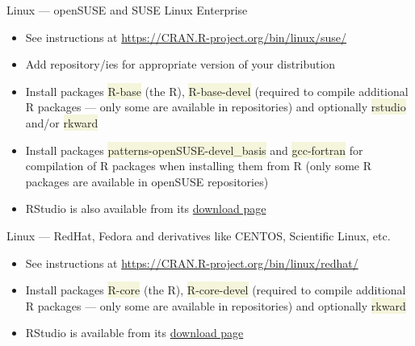 \documentclass[compress, ucs, xelatex, 11pt, xcolor=svgnames, aspectratio=169,
	hyperref={
		bookmarks=true,
		unicode=true,
		colorlinks=true,
		pdftitle={Molecular data in R},
		plainpages=false,
		pdfauthor={Vojtech Zeisek},
		pdfsubject={Course about phylogeny and evolution in R},
		pdfcreator={XeLaTeX},
		pdfkeywords={R, evolution, phylogeny, molecular data},
		linkcolor=Crimson, %
		anchorcolor=Magenta, %
		citecolor=Magenta, %
		filecolor=Magenta, %
		menucolor=Magenta, %
		urlcolor=DodgerBlue, %
		pdftex},
	url={hyphens, lowtilde} %
	]{beamer}
\renewcommand{\texttt}[1]{\colorbox{Beige}{{\ttfamily #1}}}
\begin{document}
\begin{frame}{Linux --- openSUSE and SUSE Linux Enterprise}
	\begin{itemize}
		\item See instructions at \url{https://CRAN.R-project.org/bin/linux/suse/}
		\item Add repository/ies for appropriate version of your distribution
		\begin{itemize}
		\end{itemize}
		\item Install packages \texttt{R-base} (the R), \texttt{R-base-devel} (required to compile additional R packages --- only some are available in repositories) and optionally \texttt{rstudio} and/or \texttt{rkward}
		\item Install packages \texttt{patterns-openSUSE-devel\_basis} and \texttt{gcc-fortran} for compilation of R packages when installing them from R (only some R packages are available in openSUSE repositories)
		\item RStudio is also available from its \href{https://rstudio.com/products/rstudio/download/\#download}{download page}
	\end{itemize}
\end{frame}

\begin{frame}{Linux --- RedHat, Fedora and derivatives like CENTOS, Scientific Linux, etc.}
	\begin{itemize}
		\item See instructions at \url{https://CRAN.R-project.org/bin/linux/redhat/}
		\item Install packages \texttt{R-core} (the R), \texttt{R-core-devel} (required to compile additional R packages --- only some are available in repositories) and optionally \texttt{rkward}
		\item RStudio is available from its \href{https://rstudio.com/products/rstudio/download/\#download}{download page}
	\end{itemize}
\end{frame}
\end{document}
